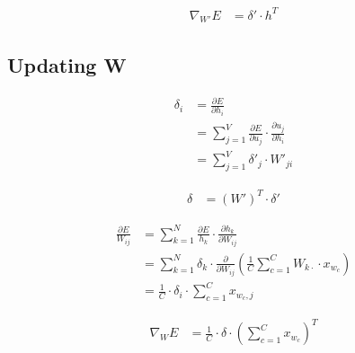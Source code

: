 \documentclass{article}
\begin{document}
	\begin{equation}
		\begin{aligned}	
			\nabla_{W'} E &= \delta' \cdot h^T
		\end{aligned}
	\end{equation}
	
	\subsection{Updating W}
	\begin{equation}
		\begin{aligned}
			\delta_i &= \frac{\partial E}{\partial h_i} \\
			&= \sum_{j=1}^{V} \frac{\partial E}{\partial u_j} \cdot \frac{\partial u_j}{\partial h_i} \\
			&= \sum_{j=1}^{V} \delta'_j \cdot W'_{ji} 
		\end{aligned}
	\end{equation}
	
	\begin{equation}
		\begin{aligned}
			\delta &= (W')^T \cdot \delta'
		\end{aligned}
	\end{equation}
	
	
	\begin{equation}
		\begin{aligned}
			\frac{\partial E}{W_{ij}} &= \sum_{k=1}^{N} \frac{\partial E}{h_k} \cdot \frac{\partial h_k}{\partial W_{ij}} \\
			&= \sum_{k=1}^{N} \delta_k \cdot \frac{\partial}{\partial W_{ij}} \left(\frac{1}{C} \sum_{c=1}^{C} W_{k\cdot} \cdot x_{w_{c}} \right)\\
			&= \frac{1}{C} \cdot \delta_i \cdot \sum_{c=1}^{C} x_{w_{c}, j}
		\end{aligned}
	\end{equation}
	
	\begin{equation}
		\begin{aligned}
			\nabla_W E &= \frac{1}{C} \cdot \delta \cdot \left(\sum_{c=1}^{C} x_{w_{c}}\right)^T \\
		\end{aligned}
	\end{equation}
	
	\begin{equation}
		\begin{aligned}
		\end{aligned}
	\end{equation}
\end{document}
